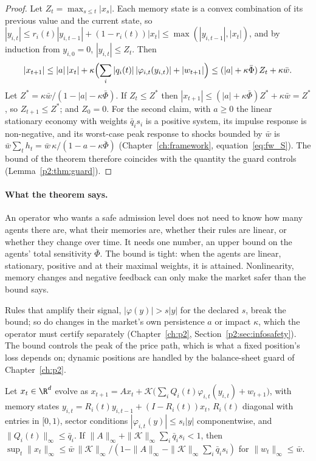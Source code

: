 \begin{proof}
Let $Z_t=\max_{s\le t}|x_s|$. Each memory state is a convex combination of its previous value and the current state, so $|y_{i,t}|\le r_i(t)|y_{i,t-1}|+(1-r_i(t))|x_t|\le\max(|y_{i,t-1}|,|x_t|)$, and by induction from $y_{i,0}=0$, $|y_{i,t}|\le Z_t$. Then
\[
|x_{t+1}|\le|a|\,|x_t|+\kappa\Bigl(\sum_i|q_i(t)|\,|\varphi_{i,t}(y_{i,t})|+|w_{t+1}|\Bigr)\le(|a|+\kappa\bar\Phi)\,Z_t+\kappa\bar w .
\]
Let $Z^*=\kappa\bar w/(1-|a|-\kappa\bar\Phi)$. If $Z_t\le Z^*$ then $|x_{t+1}|\le(|a|+\kappa\bar\Phi)Z^*+\kappa\bar w=Z^*$, so $Z_{t+1}\le Z^*$; and $Z_0=0$. For the second claim, with $a\ge0$ the linear stationary economy with weights $\bar q_is_i$ is a positive system, its impulse response is non-negative, and its worst-case peak response to shocks bounded by $\bar w$ is $\bar w\sum_th_t=\bar w\,\kappa/(1-a-\kappa\bar\Phi)$ (Chapter~\ref{ch:framework}, equation~\eqref{eq:fw_S}). The bound of the theorem therefore coincides with the quantity the guard controls (Lemma~\ref{p2:thm:guard}).
\end{proof}

\paragraph{What the theorem says.} An operator who wants a safe admission level does not need to know how many agents there are, what their memories are, whether their rules are linear, or whether they change over time. It needs one number, an upper bound on the agents' total sensitivity $\bar\Phi$. The bound is tight: when the agents are linear, stationary, positive and at their maximal weights, it is attained. Nonlinearity, memory changes and negative feedback can only make the market safer than the bound says.

\begin{remark}
Rules that amplify their signal, $|\varphi(y)|>s|y|$ for the declared $s$, break the bound; so do changes in the market's own persistence $a$ or impact $\kappa$, which the operator must certify separately (Chapter~\ref{ch:p2}, Section~\ref{p2:sec:infosafety}). The bound controls the peak of the price path, which is what a fixed position's loss depends on; dynamic positions are handled by the balance-sheet guard of Chapter~\ref{ch:p2}.
\end{remark}

\begin{proposition}\label{prop:multiasset}
Let $x_t\in\R^d$ evolve as $x_{t+1}=Ax_t+\mathcal K\bigl(\sum_iQ_i(t)\varphi_{i,t}(y_{i,t})+w_{t+1}\bigr)$, with memory states $y_{i,t}=R_i(t)y_{i,t-1}+(I-R_i(t))x_t$, $R_i(t)$ diagonal with entries in $[0,1)$, sector conditions $|\varphi_{i,t}(y)|\le s_i|y|$ componentwise, and $\|Q_i(t)\|_\infty\le\bar q_i$. If $\|A\|_\infty+\|\mathcal K\|_\infty\sum_i\bar q_is_i<1$, then $\sup_t\|x_t\|_\infty\le\bar w\,\|\mathcal K\|_\infty/(1-\|A\|_\infty-\|\mathcal K\|_\infty\sum_i\bar q_is_i)$ for $\|w_t\|_\infty\le\bar w$. \hfill\Proved
\end{proposition}

